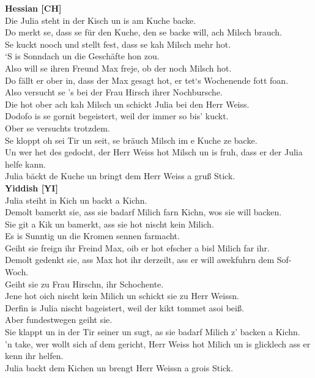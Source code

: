 \documentclass[output=paper]{LSP/langsci}
\begin{document}
\small{
\noindent\textbf{Hessian [CH]}\\
Die Julia steht in der Kisch un is am Kuche backe.\\
Do merkt se, dass se f\"ur den Kuche, den se backe will, ach Milsch brauch.\\
Se kuckt nooch und stellt fest, dass se kah Milsch mehr hot. \\
‘S is Sonndach un die Gesch\"afte hon zou.\\
Also will se ihren Freund Max freje, ob der noch Milsch hot.\\
Do f\"allt er ober in, dass der Max gesagt hot, er tet`s Wochenende fott foan.\\
Also versucht se ’s bei der Frau Hirsch ihrer Nochbursche.\\
Die hot ober ach kah Milsch un schickt Julia bei den Herr Weiss.\\
Dodofo is se gornit begeistert, weil der immer so bis’ kuckt.\\
Ober se versuchts trotzdem.\\
Se kloppt oh sei Tir un seit, se br\"auch Milsch im e Kuche ze backe.\\
Un wer het des gedocht, der Herr Weiss hot Milsch un is fruh, dass er der Julia helfe kann.\\
Julia b\"ackt de Kuche un bringt dem Herr Weiss a gruß Stick.\\


\noindent\textbf{Yiddish [YI]}\\
Julia steiht in Kich un backt a Kichn.\\
Demolt bamerkt sie, ass sie badarf Milich farn Kichn, wos sie will backen.\\
Sie git a Kik un bamerkt, ass sie hot nischt kein Milich.\\
Es is Sunntig un die Kromen sennen farmacht.\\
Geiht sie freign ihr Freind Max, oib er hot efscher a bisl Milich far ihr.\\
Demolt gedenkt sie, ass Max hot ihr derzeilt, ass er will awekfuhrn dem Sof-Woch.\\
Geiht sie zu Frau Hirschn, ihr Schochente.\\
Jene hot oich nischt kein Milich un schickt sie zu Herr Weissn.\\
Derfin is Julia nischt bageistert, weil der kikt tommet asoi beiß.\\
Aber fundestwegen geiht sie.\\
Sie klappt un in der Tir seiner un sugt, as sie badarf Milich z' backen a Kichn.\\
'n take, wer wollt sich af dem gericht, Herr Weiss hot Milich un is glicklech ass er kenn ihr helfen.\\
Julia backt dem Kichen un brengt Herr Weissn a grois Stick.\\


}
\end{document}
